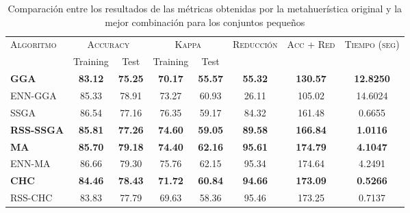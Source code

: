 \begin{table}[h!]
\centering
\begin{adjustbox}{max width =\textwidth}
\begin{tabular}{l c c c c c c c}
\hline
\multirow{2}{*}{\textsc{Algoritmo}}
	& \multicolumn{2}{c}{\textsc{Accuracy}}
	& \multicolumn{2}{c}{\textsc{Kappa}}
	& \textsc{Reducción}
	& \textsc{Acc + Red}
	& \textsc{Tiempo (seg)} \\
	& Training & Test
	& Training & Test \\ 
\hline
\hline

\textbf{GGA}  & \textbf{83.12} & \textbf{75.25} & \textbf{70.17} & \textbf{55.57} & \textbf{55.32} & \textbf{130.57} & \textbf{12.8250} \\
ENN-GGA     & 85.33 & 78.91 & 73.27 & 60.93 & 26.11 & 105.02 & 14.6024 \\

\hline

SSGA & 86.54 & 77.16 & 76.35 & 59.17 & 84.32 & 161.48 & 0.6655 \\
\textbf{RSS-SSGA} & \textbf{85.81} & \textbf{77.26} & \textbf{74.60} & \textbf{59.05} & \textbf{89.58} & \textbf{166.84} &\textbf{1.0116} \\


\hline

\textbf{MA}   & \textbf{85.70} & \textbf{79.18} & \textbf{74.40} & \textbf{62.16} & \textbf{95.61} & \textbf{174.79} & \textbf{4.1047} \\
ENN-MA & 86.66 & 79.30 & 75.76 & 62.15 & 95.34 & 174.64 & 4.2491 \\


\hline

\textbf{CHC}  & \textbf{84.46} & \textbf{78.43} & \textbf{71.72} & \textbf{60.84} & \textbf{94.66} & \textbf{173.09} & \textbf{0.5266} \\
RSS-CHC & 83.83 & 77.79 & 69.63 & 58.36 & 95.46 & 173.25 & 0.7137 \\


\hline
\end{tabular}
\end{adjustbox}
\caption{Comparación entre los resultados de las métricas obtenidas por la metahuerística original y la mejor combinación para los conjuntos pequeños}
\label{peq-best-all}

\end{table}

